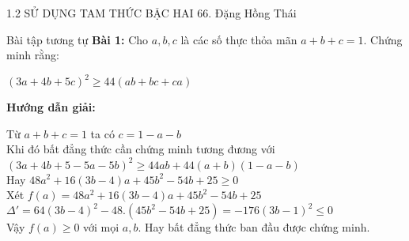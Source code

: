 \begin{frame}{1.2 SỬ DỤNG TAM THỨC BẬC HAI \hspace{3cm}  66. Đặng Hồng Thái} 
    \begin{block}{Bài tập tương tự}
        \textbf{Bài 1:} Cho $a,b,c$ là các số thực thỏa mãn $a+b+c=1$. Chứng minh rằng:
        \begin{center}
            $(3a+4b+5c)^2\geq44(ab+bc+ca)$
        \end{center}
    \end{block} 
    \pause
    \begin{center}
        \textbf{Hướng dẫn giải:}
    \end{center}
        Từ $a+b+c=1$ ta có $c=1-a-b$ \\
        Khi đó bất đẳng thức cần chứng minh tương đương với \\
        \hspace{0,5cm} $(3a+4b+5-5a-5b)^2\geq44ab+44(a+b)(1-a-b)$ \\
        \vspace{0,1cm}
        \hspace{0,5cm}Hay $48a^2+16(3b-4)a+45b^2-54b+25\geq0$ \\
        \vspace{0,1cm}
        Xét $f(a)=48a^2+16(3b-4)a+45b^2-54b+25$ \\
        \vspace{0,1cm}
        \hspace{0,5cm} $\Delta' = 64(3b-4)^2-48.(45b^2-54b+25)=-176(3b-1)^2 \leq0$ \\
        \vspace{0,1cm}
        Vậy $f(a)\geq0$ với mọi $a,b$. 
        Hay bất đẳng thức ban đầu được chứng minh. 
\end{frame}


